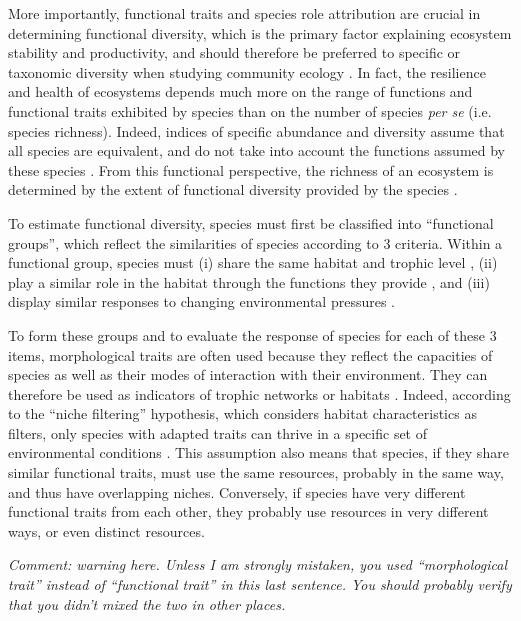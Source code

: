 More importantly, functional traits and species role attribution are crucial in determining functional diversity, which is the primary factor explaining ecosystem stability and productivity, and should therefore be preferred to specific or taxonomic diversity when studying community ecology \citep{dumay2004,mejri2009}. In fact, the resilience and health of ecosystems depends much more on the range of functions and functional traits exhibited by species than on the number of species \emph{per se} (i.e. species richness). Indeed, indices of specific abundance and diversity assume that all species are equivalent, and do not take into account the functions assumed by these species \citep{mejri2009}.
From this functional perspective, the richness of an ecosystem is determined by the extent of functional diversity provided by the species \citep{rocklin2004}.

To estimate functional diversity, species must first be classified into ``functional groups'', which reflect the similarities of species according to 3 criteria. Within a functional group, species must (i)
share the same habitat and trophic level \citep{brindamour2016}, (ii) play a similar role in the habitat through the functions they provide \citep{dumay2004,mejri2009}, and (iii) display similar responses to changing environmental pressures \citep{dumay2004,mejri2009,brindamour2016}.

To form these groups and to evaluate the response of species for each of these 3 items, morphological traits are often used because they reflect the capacities of species as well as their modes of interaction with their environment. They can therefore be used as indicators of trophic networks or habitats \citep{brindamour2016}. Indeed, according to the ``niche filtering'' hypothesis, which considers habitat characteristics as filters, only species with adapted traits can thrive in a specific set of environmental conditions \citep{brindamour2011}. This assumption also means that species, if they share similar functional traits, must use the same resources, probably in the same way, and thus have overlapping niches. Conversely, if species have very different functional traits from each other, they probably use resources in very different ways, or even distinct resources. 

\emph{Comment: warning here. Unless I am strongly mistaken, you used ``morphological trait'' instead of ``functional trait'' in this last sentence. You should probably verify that you didn't mixed the two in other places.}

